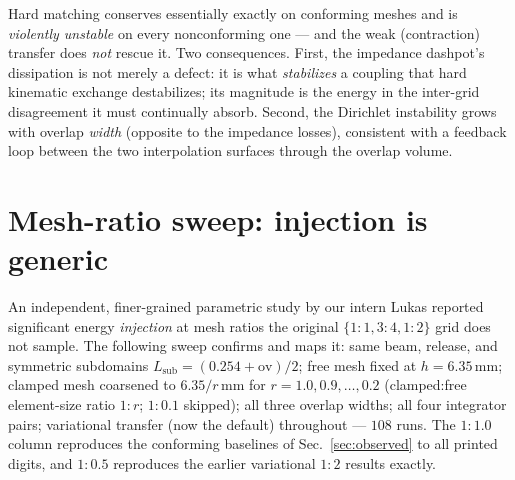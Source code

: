 \documentclass[11pt]{article}
\begin{document}
Hard matching conserves essentially exactly on conforming meshes and is
\emph{violently unstable} on every nonconforming one --- and the weak
(contraction) transfer does \emph{not} rescue it. Two consequences. First, the
impedance dashpot's dissipation is not merely a defect: it is what
\emph{stabilizes} a coupling that hard kinematic exchange destabilizes; its
magnitude is the energy in the inter-grid disagreement it must continually
absorb. Second, the Dirichlet instability grows with overlap \emph{width}
(opposite to the impedance losses), consistent with a feedback loop between
the two interpolation surfaces through the overlap volume.

\section{Mesh-ratio sweep: injection is generic}
\label{sec:ratiosweep}

An independent, finer-grained parametric study by our intern Lukas reported
significant energy \emph{injection} at mesh ratios the original
$\{1{:}1, 3{:}4, 1{:}2\}$ grid does not sample. The following sweep confirms
and maps it: same beam, release, and symmetric subdomains
$L_{\mathrm{sub}} = (0.254 + \mathrm{ov})/2$; free mesh fixed at
$h = 6.35$\,mm; clamped mesh coarsened to $6.35/r$\,mm for
$r = 1.0, 0.9, \dots, 0.2$ (clamped:free element-size ratio $1{:}r$;
$1{:}0.1$ skipped); all three overlap widths; all four integrator pairs;
variational transfer (now the default) throughout --- $108$ runs. The
$1{:}1.0$ column reproduces the conforming baselines of
Sec.~\ref{sec:observed} to all printed digits, and $1{:}0.5$ reproduces the
earlier variational $1{:}2$ results exactly.
\end{document}
